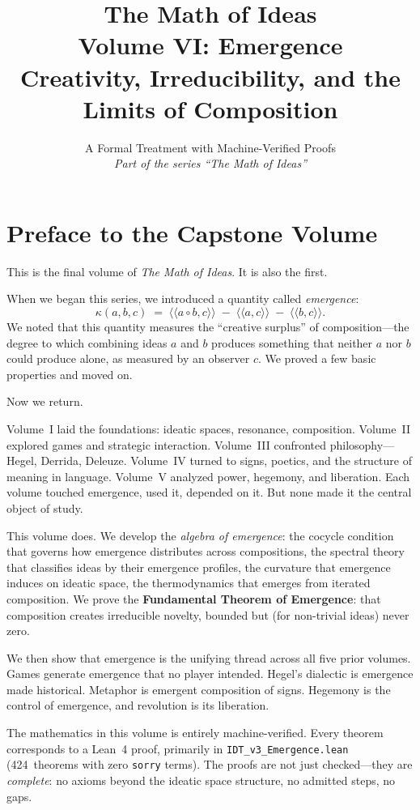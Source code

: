 \documentclass[11pt,oneside]{book}
\title{\Huge\bfseries The Math of Ideas\\[0.3em]
\LARGE Volume VI: Emergence\\[0.5em]
\Large Creativity, Irreducibility, and the Limits of Composition}
\author{A Formal Treatment with Machine-Verified Proofs\\[0.3em]
\normalsize\textit{Part of the series ``The Math of Ideas''}}
\date{}
\theoremstyle{definition}
\theoremstyle{plain}
\theoremstyle{remark}
\newcommand{\compose}{\circ}                 %
\newcommand{\rs}[2]{\langle\!\langle #1, #2 \rangle\!\rangle}  %
\newcommand{\emerge}{\kappa}                 %
\begin{document}
\maketitle

\frontmatter

\chapter*{Preface to the Capstone Volume}

This is the final volume of \emph{The Math of Ideas}. It is also the first.

When we began this series, we introduced a quantity called \emph{emergence}:
\[
  \emerge(a,b,c) \;=\; \rs{a \compose b}{c} \;-\; \rs{a}{c} \;-\; \rs{b}{c}.
\]
We noted that this quantity measures the ``creative surplus'' of composition---the
degree to which combining ideas $a$ and $b$ produces something that neither $a$
nor $b$ could produce alone, as measured by an observer $c$. We proved a few
basic properties and moved on.

Now we return.

Volume~I laid the foundations: ideatic spaces, resonance, composition. Volume~II
explored games and strategic interaction. Volume~III confronted philosophy---Hegel,
Derrida, Deleuze. Volume~IV turned to signs, poetics, and the structure of
meaning in language. Volume~V analyzed power, hegemony, and liberation. Each
volume touched emergence, used it, depended on it. But none made it the central
object of study.

This volume does. We develop the \emph{algebra of emergence}: the cocycle
condition that governs how emergence distributes across compositions, the spectral
theory that classifies ideas by their emergence profiles, the curvature that
emergence induces on ideatic space, the thermodynamics that emerges from iterated
composition. We prove the \textbf{Fundamental Theorem of Emergence}: that
composition creates irreducible novelty, bounded but (for non-trivial ideas)
never zero.

We then show that emergence is the unifying thread across all five prior volumes.
Games generate emergence that no player intended. Hegel's dialectic is emergence
made historical. Metaphor is emergent composition of signs. Hegemony is the
control of emergence, and revolution is its liberation.

The mathematics in this volume is entirely machine-verified. Every theorem
corresponds to a Lean~4 proof, primarily in \texttt{IDT\_v3\_Emergence.lean}
(424~theorems with zero \texttt{sorry} terms). The proofs are not just checked---they
are \emph{complete}: no axioms beyond the ideatic space structure, no admitted
steps, no gaps.
\end{document}
